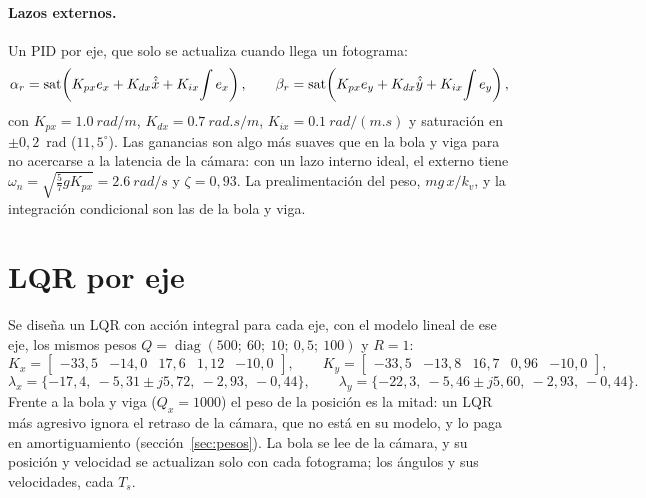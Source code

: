 \paragraph{Lazos externos.} Un PID por eje, que solo se actualiza cuando llega un fotograma:
\begin{equation}
  \alpha_r = \operatorname{sat}\!\left(K_{px}e_x + K_{dx}\hat{\dot{x}} + K_{ix}\!\int e_x\right),\qquad
  \beta_r = \operatorname{sat}\!\left(K_{px}e_y + K_{dx}\hat{\dot{y}} + K_{ix}\!\int e_y\right),
\end{equation}
con $K_{px}=\SI{1.0}{rad/m}$, $K_{dx}=\SI{0.7}{rad.s/m}$, $K_{ix}=\SI{0.1}{rad/(m.s)}$ y saturación en $\pm0{,}2$~rad ($11{,}5^\circ$). Las ganancias son algo más suaves que en la bola y viga para no acercarse a la latencia de la cámara: con un lazo interno ideal, el externo tiene $\omega_n=\sqrt{\tfrac57gK_{px}}=\SI{2.6}{rad/s}$ y $\zeta=0{,}93$. La prealimentación del peso, $mg\,x/k_v$, y la integración condicional son las de la bola y viga.

\section{LQR por eje}

Se diseña un LQR con acción integral para cada eje, con el modelo lineal de ese eje, los mismos pesos $Q=\operatorname{diag}(500;\ 60;\ 10;\ 0{,}5;\ 100)$ y $R=1$:
\[
K_x=\begin{bmatrix}-33{,}5 & -14{,}0 & 17{,}6 & 1{,}12 & -10{,}0\end{bmatrix},\qquad
K_y=\begin{bmatrix}-33{,}5 & -13{,}8 & 16{,}7 & 0{,}96 & -10{,}0\end{bmatrix},
\]
\[
\lambda_x=\{-17{,}4,\ -5{,}31\pm j5{,}72,\ -2{,}93,\ -0{,}44\},\qquad
\lambda_y=\{-22{,}3,\ -5{,}46\pm j5{,}60,\ -2{,}93,\ -0{,}44\}.
\]
Frente a la bola y viga ($Q_x=1000$) el peso de la posición es la mitad: un LQR más agresivo ignora el retraso de la cámara, que no está en su modelo, y lo paga en amortiguamiento (sección~\ref{sec:pesos}). La bola se lee de la cámara, y su posición y velocidad se actualizan solo con cada fotograma; los ángulos y sus velocidades, cada $T_s$.

